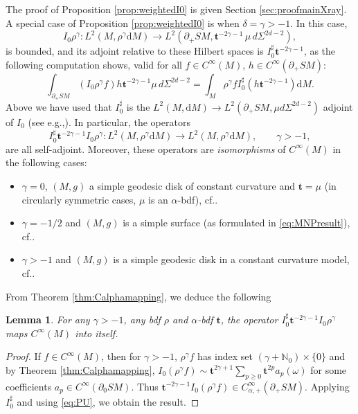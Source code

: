 \documentclass[11pt]{article}
\newcommand{\eg}{e.g.,\xspace}
\newcommand{\cf}{cf.\xspace}
\theoremstyle{plain}
\newtheorem{Lemma}[Theorem]{Lemma}
\theoremstyle{definition}
\theoremstyle{remark}
\def\Nm{{\mathbb{N}}}
\newcommand{\bt}{{\boldsymbol{t}}}
\newcommand{\adj}{I_0^\sharp}
\newcommand {\dM}{\mathrm{d}M}
\begin{document}
The proof of Proposition \ref{prop:weightedI0} is given Section \ref{sec:proofmainXray}. A special case of Proposition \ref{prop:weightedI0} is when $\delta = \gamma > -1$. In this case,
\begin{equation*}
I_0 \rho^{\gamma} \colon L^2(M, \rho^{\gamma}\dM) \to L^2(\partial_+ SM, \bt^{-2\gamma-1} \, \mu \, d\Sigma^{2d-2}),
\end{equation*}
is bounded, and its adjoint relative to these Hilbert spaces is $\adj \bt^{-2\gamma-1}$, as the following computation shows, valid for all $f\in C^\infty(M)$, $h \in C^\infty(\partial_+ SM)$:
\begin{equation*}
\int_{\partial_+ SM} (I_0 \rho^\gamma f) h \bt^{-2\gamma-1} \mu\,d\Sigma^{2d-2} = \int_{M} \rho^\gamma f \adj (h \bt^{-2\gamma-1}) \dM.
\end{equation*}
Above we have used that $I_0^\sharp$ is the $L^2(M,\dM)\to L^2(\partial_+ SM, \mu d\Sigma^{2d-2})$ adjoint of $I_0$ (see \eg \cite[Lem.\,4.1.4]{Paternain2021}). In particular, the operators
\begin{equation*}
\adj \bt^{-2\gamma-1} I_0 \rho^\gamma \colon L^2(M, \rho^{\gamma}\dM) \to L^2(M, \rho^{\gamma}\dM), \qquad \gamma > -1,
\end{equation*}
are all self-adjoint. Moreover, these operators are {\em isomorphisms} of $C^\infty(M)$ in the following cases:
\begin{itemize}
\item $\gamma = 0$, $(M,g)$ a simple geodesic disk of constant curvature and $\bt = \mu$ (in circularly symmetric cases, $\mu$ is an $\alpha$-bdf), \cf \cite{Monard2019a}.
\item $\gamma = -1/2$ and $(M,g)$ is a simple surface (as formulated in \eqref{eq:MNPresult}), \cf \cite{Monard2019}.
\item $\gamma>-1$ and $(M,g)$ is a simple geodesic disk in a constant curvature model, \cf \cite{Mishra2022}.
\end{itemize}

From Theorem \ref{thm:Calphamapping}, we deduce the following
\begin{Lemma}
For any $\gamma>-1$, any bdf $\rho$ and $\alpha$-bdf $\bt$, the operator $\adj \bt^{-2\gamma-1} I_0 \rho^\gamma$ maps $C^\infty(M)$ into itself.
\end{Lemma}
\begin{proof} If $f\in C^\infty(M)$, then for $\gamma>-1$, $\rho^\gamma f$ has index set $(\gamma + \Nm_0)\times \{0\}$ and by
Theorem \ref{thm:Calphamapping}, $I_0 (\rho^\gamma f) \sim \bt^{2\gamma+1} \sum_{p\ge 0} \bt^{2p} a_p(\omega)$ for some coefficients
$a_p\in C^\infty(\partial_0 SM)$. Thus $\bt^{-2\gamma-1} I_0 (\rho^\gamma f)\in C_{\alpha,+}^\infty(\partial_+ SM)$. Applying $\adj$
and using \eqref{eq:PU}, we obtain the result.
\end{proof}
\end{document}
